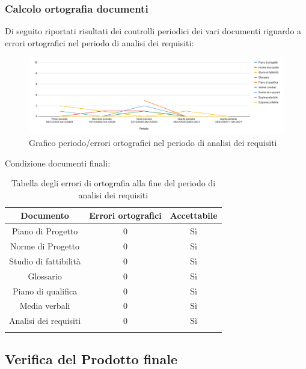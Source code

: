 \subsubsection{Calcolo ortografia documenti}
Di seguito riportati risultati dei controlli periodici dei vari documenti riguardo a errori ortografici nel periodo di analisi dei requisiti:
\begin{figure}[H]
	\centering
	\includegraphics[width=0.8\linewidth]{./res/images/ortografia.png}
	\caption{Grafico periodo/errori ortografici nel periodo di analisi dei requisiti}
	\label{fig:Grafico errori ortografici periodo di analisi dei requisiti}
\end{figure}

Condizione documenti finali:
\begin{center}
	\begin{longtable}{|c|c|c|}
	\hline
	\rowcolor{lighter-grayer}
	\textbf{Documento} & \textbf{Errori ortografici} & \textbf{Accettabile} \\
	\hline
	\endfirsthead

	\hline
	Piano di Progetto & 0 & Sì \\
	\hline
	\hline
	Norme di Progetto &  0 & Sì \\
	\hline
	\hline
	Studio di fattibilità & 0 & Sì \\
	\hline
	\hline
	Glossario & 0 & Sì \\
	\hline
	\hline
	Piano di qualifica & 0 & Sì \\
	\hline
	\hline
	Media verbali & 0 & Sì \\
	\hline
	\hline
	Analisi dei requisiti & 0 & Sì \\
	\hline
	\rowcolor{white}
	\caption{Tabella degli errori di ortografia alla fine del periodo di analisi dei requisiti}
	\end{longtable}
\end{center}











\subsection{Verifica del Prodotto finale}	
